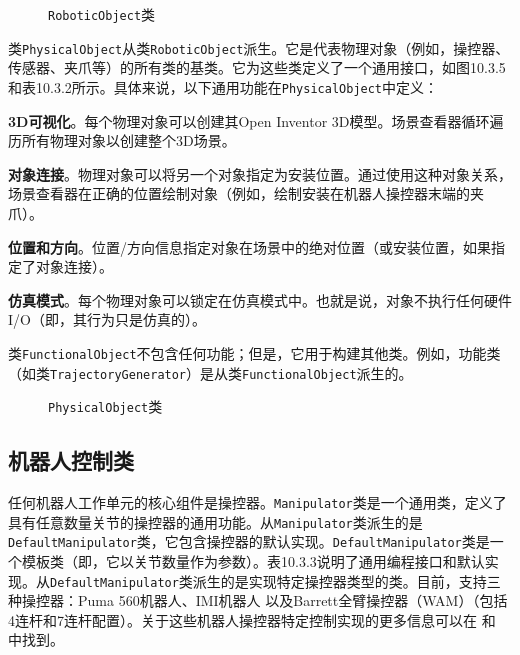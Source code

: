 \documentclass[UTF8,a4paper,12pt]{ctexart}
\begin{document}
\begin{figure}[htbp]
\centering
{}
\caption{\texttt{RoboticObject}类}
\label{fig:10.3.4}
\end{figure}

类\texttt{PhysicalObject}从类\texttt{RoboticObject}派生。它是代表物理对象（例如，操控器、传感器、夹爪等）的所有类的基类。它为这些类定义了一个通用接口，如图10.3.5和表10.3.2所示。具体来说，以下通用功能在\texttt{PhysicalObject}中定义：

\textbf{3D可视化}。每个物理对象可以创建其Open Inventor 3D模型。场景查看器循环遍历所有物理对象以创建整个3D场景。

\textbf{对象连接}。物理对象可以将另一个对象指定为安装位置。通过使用这种对象关系，场景查看器在正确的位置绘制对象（例如，绘制安装在机器人操控器末端的夹爪）。

\textbf{位置和方向}。位置/方向信息指定对象在场景中的绝对位置（或安装位置，如果指定了对象连接）。

\textbf{仿真模式}。每个物理对象可以锁定在仿真模式中。也就是说，对象不执行任何硬件I/O（即，其行为只是仿真的）。

类\texttt{FunctionalObject}不包含任何功能；但是，它用于构建其他类。例如，功能类（如类\texttt{TrajectoryGenerator}）是从类\texttt{FunctionalObject}派生的。

\begin{figure}[htbp]
\centering
{}
\caption{\texttt{PhysicalObject}类}
\label{fig:10.3.5}
\end{figure}

\subsection{机器人控制类}

任何机器人工作单元的核心组件是操控器。\texttt{Manipulator}类是一个通用类，定义了具有任意数量关节的操控器的通用功能。从\texttt{Manipulator}类派生的是\texttt{DefaultManipulator}类，它包含操控器的默认实现。\texttt{DefaultManipulator}类是一个模板类（即，它以关节数量作为参数）。表10.3.3说明了通用编程接口和默认实现。从\texttt{DefaultManipulator}类派生的是实现特定操控器类型的类。目前，支持三种操控器：Puma 560机器人、IMI机器人 \cite{Berkeley1992} 以及Barrett全臂操控器（WAM）\cite{Barrett}（包括4连杆和7连杆配置）。关于这些机器人操控器特定控制实现的更多信息可以在 \cite{Loffler2001} 和 \cite{Costescu1999} 中找到。
\end{document}
